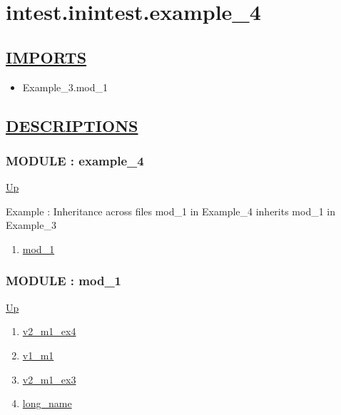 \chapter*{intest.inintest.example\_4}
\hypertarget{ecldoc:toc:intest.inintest.example_4}{}

\section*{\underline{IMPORTS}}
\begin{itemize}
\item Example\_3.mod\_1
\end{itemize}

\section*{\underline{DESCRIPTIONS}}
\subsection*{MODULE : example\_4}
\hypertarget{ecldoc:intest.inintest.example_4}{}
\par
\begin{minipage}[t]{\textwidth}
\begin{flushleft}
  
\end{flushleft}
\end{minipage}
\hyperlink{ecldoc:toc:intest/inintest}{Up} \\
\par
Example : Inheritance across files mod\_1 in Example\_4 inherits mod\_1 in Example\_3 \\
\par
\begin{enumerate}
\item \hyperlink{ecldoc:intest.inintest.example_4.mod_1}{mod\_1}
\end{enumerate}
\subsection*{MODULE : mod\_1}
\hypertarget{ecldoc:intest.inintest.example_4.mod_1}{}
\par
\begin{minipage}[t]{\textwidth}
\begin{flushleft}
  
\end{flushleft}
\end{minipage}
\hyperlink{ecldoc:intest.inintest.example_4}{Up} \\
\par
\par
\begin{enumerate}
\item \hyperlink{ecldoc:intest.inintest.example_4.mod_1.v2_m1_ex4}{v2\_m1\_ex4}
\item \hyperlink{ecldoc:example_3.mod_1.v1_m1}{v1\_m1}
\item \hyperlink{ecldoc:example_3.mod_1.v2_m1_ex3}{v2\_m1\_ex3}
\item \hyperlink{ecldoc:example_3.mod_1.long_name}{long\_name}
\end{enumerate}
